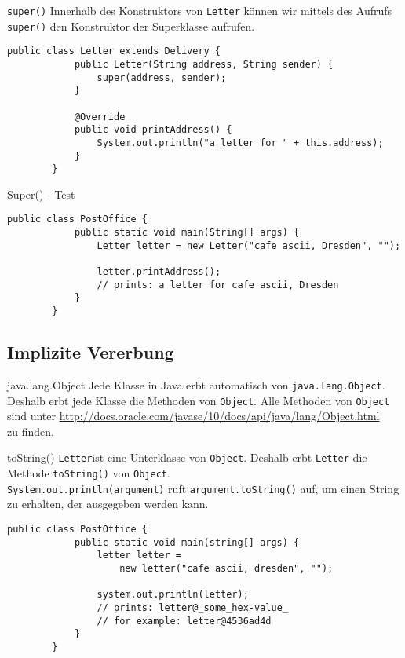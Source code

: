 \begin{frame}[fragile]{\texttt{super()}}
	Innerhalb des Konstruktors von \texttt{Letter} können wir mittels des Aufrufs \texttt{super()} den Konstruktor der Superklasse aufrufen. 
	\begin{lstlisting}[gobble=8]
        public class Letter extends Delivery {
            public Letter(String address, String sender) {
                super(address, sender);
            }
        
            @Override
            public void printAddress() {
                System.out.println("a letter for " + this.address);    
            }	
        }
	\end{lstlisting}
\end{frame}

\begin{frame}[fragile]{Super() - Test}
    \begin{lstlisting}[gobble=8]
        public class PostOffice {
            public static void main(String[] args) {	    
                Letter letter = new Letter("cafe ascii, Dresden", "");
                
                letter.printAddress();
                // prints: a letter for cafe ascii, Dresden
            }
        }
	\end{lstlisting}
\end{frame}

\subsection{Implizite Vererbung}
\begin{frame}{java.lang.Object}
	Jede Klasse in Java erbt automatisch von \texttt{java.lang.Object}. 
	Deshalb erbt jede Klasse die Methoden von \texttt{Object}.
	\vfill
    Alle Methoden von \texttt{Object} sind unter \scriptsize\url{http://docs.oracle.com/javase/10/docs/api/java/lang/Object.html} \normalsize \\ zu
	finden.
\end{frame}

\begin{frame}[fragile]{toString()}
	\texttt{Letter}ist eine Unterklasse von \texttt{Object}.
	Deshalb erbt \texttt{Letter} die Methode \texttt{toString()} von \texttt{Object}.\\
	\texttt{System.out.println(argument)} ruft \texttt{argument.toString()} auf, um einen String zu erhalten, der ausgegeben werden kann.
    \begin{lstlisting}[gobble=8]
        public class PostOffice {
            public static void main(string[] args) {	    
                letter letter = 
                    new letter("cafe ascii, dresden", "");
                
                system.out.println(letter);
                // prints: letter@_some_hex-value_
                // for example: letter@4536ad4d
            }
        }
	\end{lstlisting}
\end{frame}

